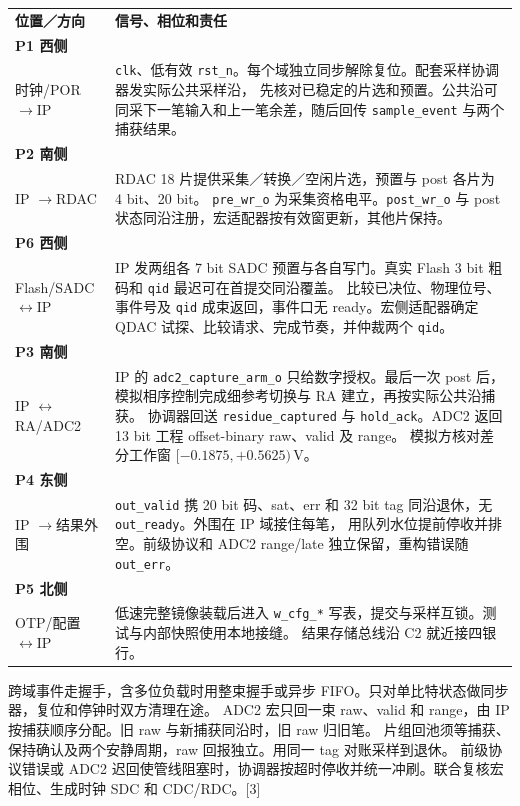 \documentclass[UTF8,fontset=none,zihao=-4,a4paper]{ctexart}
\renewcommand{\arraystretch}{1.22}
\newcommand{\sym}[1]{\texttt{#1}}
\newcommand{\src}[1]{{\color{muted}\nobreak\hspace{0.35em}[#1]}}
\newcommand{\arr}{\(\rightarrow\)}
\newcommand{\biarr}{\(\leftrightarrow\)}
\newcommand{\topic}[1]{%
  \par\vspace{3pt}\noindent{\fontsize{13}{17}\selectfont\bfseries\color{teal} #1}\par
  \vspace{-3pt}%
}
\newcommand{\tabhead}{\rowcolor{pale}}
\begin{document}
{\small\renewcommand{\arraystretch}{1.16}
\begin{tabularx}{\linewidth}{@{}L{33mm}Y@{}}
\tabhead \textbf{位置／方向} & \textbf{信号、相位和责任}\\
\textbf{P1 西侧}\\时钟/POR \arr IP &
\sym{clk}、低有效 \sym{rst\_n}。每个域独立同步解除复位。配套采样协调器发实际公共采样沿，
先核对已稳定的片选和预置。公共沿可同采下一笔输入和上一笔余差，随后回传 \sym{sample\_event} 与两个捕获结果。\\
\textbf{P2 南侧}\\IP \arr RDAC &
RDAC 18 片提供采集／转换／空闲片选，预置与 post 各片为 4 bit、20 bit。
\sym{pre\_wr\_o} 为采集资格电平。\sym{post\_wr\_o} 与 post 状态同沿注册，宏适配器按有效窗更新，其他片保持。\\
\textbf{P6 西侧}\\Flash/SADC \biarr IP &
IP 发两组各 7 bit SADC 预置与各自写门。真实 Flash 3 bit 粗码和 \sym{qid} 最迟可在首提交同沿覆盖。
比较已决位、物理位号、事件号及 \sym{qid} 成束返回，事件口无 ready。宏侧适配器确定 QDAC 试探、比较请求、完成节奏，并仲裁两个 \sym{qid}。\\
\textbf{P3 南侧}\\IP \biarr RA/ADC2 &
IP 的 \sym{adc2\_capture\_arm\_o} 只给数字授权。最后一次 post 后，模拟相序控制完成细参考切换与 RA 建立，再按实际公共沿捕获。
协调器回送 \sym{residue\_captured} 与 \sym{hold\_ack}。ADC2 返回 13 bit 工程 offset-binary raw、valid 及 range。
模拟方核对差分工作窗 \([-0.1875, +0.5625)\,\mathrm{V}\)。\\
\textbf{P4 东侧}\\IP \arr 结果外围 &
\sym{out\_valid} 携 20 bit 码、sat、err 和 32 bit tag 同沿退休，无 \sym{out\_ready}。外围在 IP 域接住每笔，
用队列水位提前停收并排空。前级协议和 ADC2 range/late 独立保留，重构错误随 \sym{out\_err}。\\
\textbf{P5 北侧}\\OTP/配置 \biarr IP &
低速完整镜像装载后进入 \sym{w\_cfg\_*} 写表，提交与采样互锁。测试与内部快照使用本地接缝。
结果存储总线沿 C2 就近接四银行。\\
\bottomrule
\end{tabularx}\par}

\topic{跨域和同笔对账}
跨域事件走握手，含多位负载时用整束握手或异步 FIFO。只对单比特状态做同步器，复位和停钟时双方清理在途。
ADC2 宏只回一束 raw、valid 和 range，由 IP 按捕获顺序分配。旧 raw 与新捕获同沿时，旧 raw 归旧笔。
片组回池须等捕获、保持确认及两个安静周期，raw 回报独立。用同一 tag 对账采样到退休。
前级协议错误或 ADC2 迟回使管线阻塞时，协调器按超时停收并统一冲刷。联合复核宏相位、生成时钟 SDC 和 CDC/RDC。\src{3}
\end{document}

